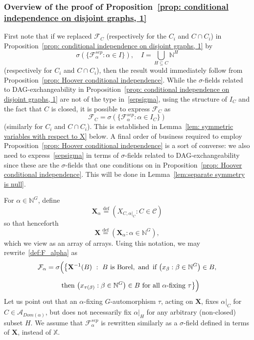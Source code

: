 \documentclass[AHL,Unicode,longabstracts,published]{cedram}
\newcommand{\alf}{\alpha}%
\newcommand*\bb{\beta}
\newcommand*{\defeq}{\stackrel{\mathrm{def}}{=}}
\newcommand*{\sep}{\mathit{sep}}
\newcommand*\dom{\mathit{Dom}}
\newcommand*\X{\mathbb{X}}
\newcommand*\N{\mathbb{N}}
\renewcommand{\AA}{\mathcal{A}}
\newcommand*\CC{{\mathcal{C}}}
\newcommand*\FF{\mathcal{F}}
\newcommand*\bX{\mathbf{X}}
\newcommand*\N{\mathbb{N}}
\begin{document}

\subsubsection{Overview of the proof of Proposition~\ref{prop: conditional independence on disjoint graphs, 1}}

First note that if we replaced $\FF_C$ (respectively for the $C_i$ and $C\cap C_i$) in Proposition~\ref{prop: conditional independence on disjoint graphs, 1} by
\begin{equation}\label{sepsigma}
\sigma(\{\FF_\alf ^{\sep}:\alf\in I\}),\quad I=\bigcup_{H \subseteq C} \N^H
\end{equation}
(respectively for $C_i$ and $C\cap C_i$), then the result would immediately follow from Proposition~\ref{prop: Hoover conditional independence}. While the $\sigma$-fields related to DAG-exchangeability in Proposition~\ref{prop: conditional independence on disjoint graphs, 1} are not of the type in~\eqref{sepsigma}, using the structure of $I_C$ and the fact that $C$ is closed, it is possible to express $\FF_C$ as
\begin{equation}\label{sep dag rel}
\FF_C=\sigma(\{\FF_\alf ^{\sep}: \alf \in I_C\})
\end{equation}
(similarly for $C_i$ and $C\cap C_i$). This is established in Lemma~\ref{lem: symmetric variables with respect to X} below. A final order of business required to employ Proposition~\ref{prop: Hoover conditional independence} is a sort of converse: we also need to express~\eqref{sepsigma} in terms of $\sigma$-fields related to DAG-exchangeability since these are the $\sigma$-fields that one conditions on in Proposition~\ref{prop: Hoover conditional independence}. This will be done in Lemma~\ref{lem:separate symmetry is null}.

\vspace{3mm}

For $\alf \in \N^G$, define
\[
\bX_\alpha
\defeq (X_{C,\alf|_C}: C \in \CC)
\]
so that henceforth
\[
\bX
\defeq (\bX_\alf:\alf \in \N^G),
\]
which we view as an array of arrays.
Using this notation, we may rewrite~\eqref{def:F_alpha} as
\begin{multline}\label{eq: Faa2}
\mathcal{F}_\alf = \sigma\Big(\big\{\bX^{-1}(B)~:~
B \text{ is Borel,\, and\, }
\text{if } \big(x_{\bb} : {\bb}\in \N^G \big) \in B,
\\[0.5em]
\quad
\text{then } \big(x_{\tau(\bb)} : \bb \in \N^G \big) \in B
\text{ for all $\alf$-fixing }\tau
\big\}\Big)
\end{multline}
Let us point out that an $\alf$-fixing $G$-automorphism $\tau$, acting on $\bX$, fixes $\alf|_C$ for $C \in \AA_{\dom(\alf)}$, but does not necessarily fix $\alf|_H$ for any arbitrary (non-closed) subset $H$. We assume that $\FF_\alf^\sep$ is rewritten similarly as a $\sigma$-field defined in terms of $\bX$, instead of $\X$.
\end{document}
